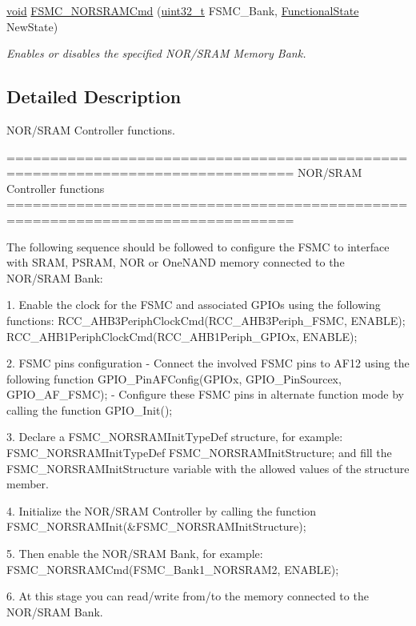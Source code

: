 \begin{DoxyCompactItemize}
\hyperlink{group___n_a_m_e_ga18028b8badbf1ea7e704ccac3c488e82}{void} \hyperlink{group___f_s_m_c___group1_gaf943f0f2680168d3a95a3c2c9f3eca2a}{F\-S\-M\-C\-\_\-\-N\-O\-R\-S\-R\-A\-M\-Cmd} (\hyperlink{stdint_8h_a435d1572bf3f880d55459d9805097f62}{uint32\-\_\-t} F\-S\-M\-C\-\_\-\-Bank, \hyperlink{group___exported__types_gac9a7e9a35d2513ec15c3b537aaa4fba1}{Functional\-State} New\-State)
\begin{DoxyCompactList}\small\item\em Enables or disables the specified N\-O\-R/\-S\-R\-A\-M Memory Bank. \end{DoxyCompactList}\end{DoxyCompactItemize}


\subsection{Detailed Description}
N\-O\-R/\-S\-R\-A\-M Controller functions. \begin{DoxyVerb} ===============================================================================
                    NOR/SRAM Controller functions
 ===============================================================================  

 The following sequence should be followed to configure the FSMC to interface with
 SRAM, PSRAM, NOR or OneNAND memory connected to the NOR/SRAM Bank:
 
   1. Enable the clock for the FSMC and associated GPIOs using the following functions:
          RCC_AHB3PeriphClockCmd(RCC_AHB3Periph_FSMC, ENABLE);
          RCC_AHB1PeriphClockCmd(RCC_AHB1Periph_GPIOx, ENABLE);

   2. FSMC pins configuration 
       - Connect the involved FSMC pins to AF12 using the following function 
          GPIO_PinAFConfig(GPIOx, GPIO_PinSourcex, GPIO_AF_FSMC); 
       - Configure these FSMC pins in alternate function mode by calling the function
          GPIO_Init();    
       
   3. Declare a FSMC_NORSRAMInitTypeDef structure, for example:
          FSMC_NORSRAMInitTypeDef  FSMC_NORSRAMInitStructure;
      and fill the FSMC_NORSRAMInitStructure variable with the allowed values of
      the structure member.
      
   4. Initialize the NOR/SRAM Controller by calling the function
          FSMC_NORSRAMInit(&FSMC_NORSRAMInitStructure); 

   5. Then enable the NOR/SRAM Bank, for example:
          FSMC_NORSRAMCmd(FSMC_Bank1_NORSRAM2, ENABLE);  

   6. At this stage you can read/write from/to the memory connected to the NOR/SRAM Bank. \end{DoxyVerb}
 

